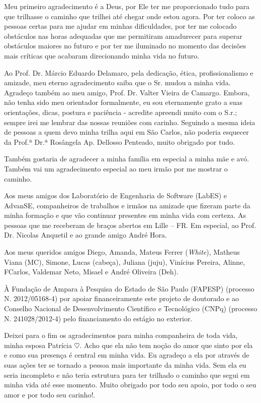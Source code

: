 Meu primeiro agradecimento é a Deus, por Ele ter me proporcionado tudo para que trilhasse o caminho que trilhei até chegar onde estou agora. Por ter coloco as pessoas certas para me ajudar em minhas dificuldades, por ter me colocado obstáculos nas horas adequadas que me permitiram amadurecer para superar obstáculos maiores no futuro e por ter me iluminado no momento das decisões mais críticas que acabaram direcionando minha vida no futuro.

Ao Prof. Dr. Márcio Eduardo Delamaro, pela dedicação, ética, profissionalismo e amizade, meu eterno agradecimento saiba que o Sr. mudou a minha vida. Agradeço também ao meu amigo, Prof. Dr. Valter Vieira de Camargo. Embora, não tenha sido meu orientador formalmente, eu sou eternamente grato a suas orientações, dicas, postura e paciência - acredite apreendi muito com o S.r.; sempre irei me lembrar das nossas reuniões com carinho. Seguindo a mesma ideia de pessoas a quem devo minha trilha aqui em São Carlos, não poderia esquecer da Prof.ª Dr.ª Rosângela Ap. Dellosso Penteado, muito obrigado por tudo.

Também gostaria de agradecer a minha família em especial a minha mãe e avó. Também vai um agradecimento especial ao meu irmão por me mostrar o caminho.

Aos meus amigos dos Laboratório de Engenharia de Software (LabES) e AdvanSE, companheiros de trabalhos e irmãos na amizade que fizeram parte da minha formação e que vão continuar presentes em minha vida com certeza. As pessoas que me receberam de braços abertos em Lille – FR. Em especial, ao Prof. Dr. Nicolas Anquetil e ao grande amigo André Hora. 

Aos meus queridos amigos Diego, Amanda, Mateus Ferrer (\textit{White}), Matheus Viana (MC), Simone, Lucas (cabeça), Juliana (juju), Vinícius Pereira, Alinne, FCarlos, Valdemar Neto, Misael e André Oliveira (Deh).

À Fundação de Ampara à Pesquisa do Estado de São Paulo (FAPESP) (processo N. 2012/05168-4) por apoiar financeiramente este projeto de doutorado e ao Conselho Nacional de Desenvolvimento Científico e Tecnológico (CNPq) (processo N. 241028/2012-4) pelo financiamento do estágio no exterior.

Deixei para o fim os agradecimentos para minha companheira de toda vida, minha esposa Patrícia $\heartsuit$. Acho que ela não tem noção do amor que sinto por ela e como sua presença é central em minha vida. Eu agradeço a ela por através de suas ações ter se tornado a pessoa mais importante da minha vida. Sem ela eu seria incompleto e não teria estrutura para ter trilhado o caminho que segui em minha vida até esse momento. Muito obrigado por todo seu apoio, por todo o seu amor e por todo seu carinho!.

